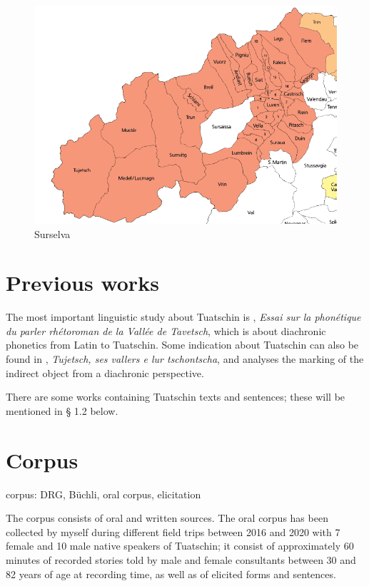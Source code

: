 \begin{figure}
	\includegraphics[height=.5\textheight]{figures/Surselva.png}
	\caption{Surselva}
	\label{fig:surs}
\end{figure}


\section{Previous works}
The most important linguistic study about Tuatschin is  \citet{Caduff1952}, \textit{Essai sur la phonétique du parler rhétoroman de la Vallée de Tavetsch}, which is about diachronic phonetics from Latin to Tuatschin. Some indication about Tuatschin can also be found in \citet{VicHendry2010}, \textit{Tujetsch, ses vallers e lur tschontscha}, and \citet{Maurer2017} analyses the marking of the indirect object from a diachronic perspective. 

There are some works containing Tuatschin texts and sentences; these will be mentioned in § 1.2 below.

\section{Corpus}
corpus: DRG, Büchli, oral corpus, elicitation


The corpus consists of oral and written sources. The oral corpus has been collected by myself during different field trips between 2016 and 2020 with 7 female and 10 male native speakers of Tuatschin; it consist of approximately 60 minutes of recorded stories told by male and female consultants between 30 and 82 years of age at recording time, as well as of elicited forms and sentences.

